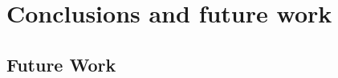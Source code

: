 \documentclass[12pt]{article}
\begin{document}
\section{Conclusions and future work}\label{sec:conclusion}




\subsection{Future Work}\label{sec:future}








%
%




%  
%
%










\end{document}

